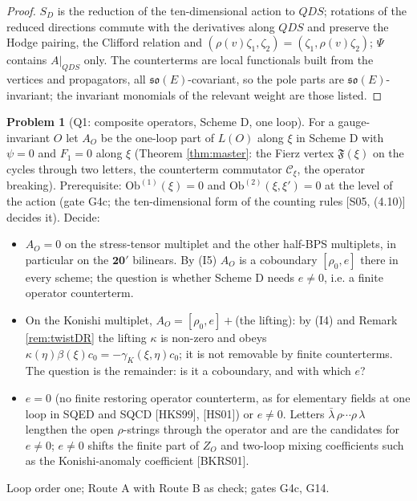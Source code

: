 \documentclass[11pt]{article}
\theoremstyle{definition}
\newtheorem{problem}[definition]{Problem}
\numberwithin{equation}{section}
\begin{document}
\begin{proof}
$S_D$ is the reduction of the ten-dimensional action to $QDS$; rotations of the reduced directions commute with the derivatives along $QDS$ and preserve the Hodge pairing, the Clifford relation and $(\rho(v)\zeta_1,\zeta_2)=(\zeta_1,\rho(v)\zeta_2)$; $\Psi$ contains $A|_{QDS}$ only. The counterterms are local functionals built from the vertices and propagators, all $\mathfrak{so}(E)$-covariant, so the pole parts are $\mathfrak{so}(E)$-invariant; the invariant monomials of the relevant weight are those listed.
\end{proof}

\begin{problem}[Q1: composite operators, Scheme D, one loop]
\label{q:Q1}
For a gauge-invariant $O$ let $A_O$ be the one-loop part of $L(O)$ along $\xi$ in Scheme D with $\psi=0$ and $F_1=0$ along $\xi$ (Theorem \ref{thm:master}: the Fierz vertex $\mathfrak F(\xi)$ on the cycles through two letters, the counterterm commutator $\mathcal C_\xi$, the operator breaking). Prerequisite: $\mathrm{Ob}^{(1)}(\xi)=0$ and $\mathrm{Ob}^{(2)}(\xi,\xi')=0$ at the level of the action (gate G4c; the ten-dimensional form of the counting rules [S05, (4.10)] decides it). Decide:
\begin{itemize}
\item[(a)] $A_O=0$ on the stress-tensor multiplet and the other half-BPS multiplets, in particular on the $\mathbf{20}'$ bilinears. By (I5) $A_O$ is a coboundary $[\rho_0,e]$ there in every scheme; the question is whether Scheme D needs $e\neq0$, i.e. a finite operator counterterm.
\item[(b)] On the Konishi multiplet, $A_O=[\rho_0,e]+$(the lifting): by (I4) and Remark \ref{rem:twistDR} the lifting $\kappa$ is non-zero and obeys $\kappa(\eta)\beta(\xi)c_0=-\gamma_K(\xi,\eta)c_0$; it is not removable by finite counterterms. The question is the remainder: is it a coboundary, and with which $e$?
\item[(c)] $e=0$ (no finite restoring operator counterterm, as for elementary fields at one loop in SQED and SQCD [HKS99], [HS01]) or $e\neq0$. Letters $\bar\lambda\,\rho\cdots\rho\,\lambda$ lengthen the open $\rho$-strings through the operator and are the candidates for $e\neq0$; $e\neq0$ shifts the finite part of $Z_O$ and two-loop mixing coefficients such as the Konishi-anomaly coefficient [BKRS01].
\end{itemize}
Loop order one; Route A with Route B as check; gates G4c, G14.
\end{problem}
\end{document}
